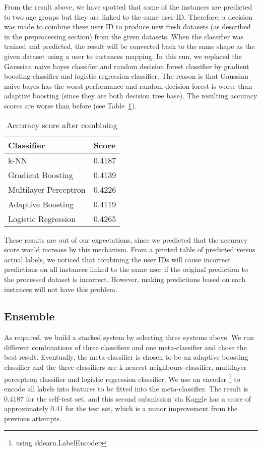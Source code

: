 \documentclass[10pt]{article}
\begin{document}
From the result above, we have spotted that some of the instances are predicted to two age groups but they are linked to the same user ID. Therefore, a decision was made to combine these user ID to produce new fresh datasets (as described in the preprocessing section) from the given datasets. When the classifier was trained and predicted, the result will be converted back to the same shape as the given dataset using a user to instances mapping. In this run, we replaced the Gaussian naive bayes classifier and random decision forest classifier by gradient boosting classifier and logistic regression classifier. The reason is that Gaussian naive bayes has the worst performance and random decision forest is worse than adaptive boosting (since they are both decision tree base). The resulting accuracy scores are worse than before (see Table~\ref{table2}).
\begin{table}[ht]
\begin{center}
\begin{tabular}{|l|l|}
    \hline
    Classifier & Score\\
    \hline\hline
    k-NN & 0.4187\\
    Gradient Boosting & 0.4139\\
    Multilayer Perceptron  & 0.4226\\
    Adaptive Boosting & 0.4119\\
    Logistic Regression & 0.4265\\
    \hline
\end{tabular}
\caption{Accuracy score after combining}\label{table2}
\end{center}
\end{table}
These results are out of our expectations, since we predicted that the accuracy score would increase by this mechanism. From a printed table of predicted versus actual labels, we noticed that combining the user IDs will cause incorrect predictions on all instances linked to the same user if the original prediction to the processed dataset is incorrect. However, making predictions based on each instances will not have this problem.

\subsection{Ensemble}

As required, we build a stacked system by selecting three systems above. We run different combinations of three classifiers and one meta-classifier and chose the best result. Eventually, the meta-classifier is chosen to be an adaptive boosting classifier and the three classifiers are k-nearest neighbours classifier, multilayer perceptron classifier and logistic regression classifier. We use an encoder
\footnote{using sklearn.LabelEncoder}
to encode all labels into features to be fitted into the meta-classifier. The result is 0.4187 for the self-test set, and this second submission via Kaggle has a score of approximately 0.41 for the test set, which is a minor improvement from the previous attempts.
\end{document}
